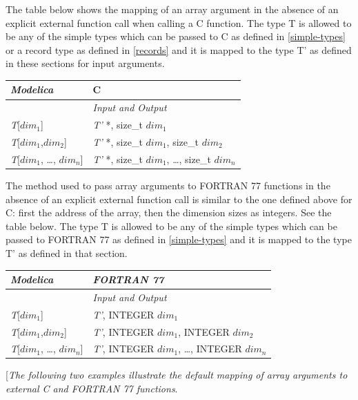 \documentclass[10pt,a4paper]{report}
\begin{document}
The table below shows the mapping of an array argument in the absence of
an explicit external function call when calling a C function. The type T
is allowed to be any of the simple types which can be passed to C as
defined in \ref{simple-types} or a record type as defined in 
\ref{records} and it is mapped to the type T' as defined in these sections
for input arguments.

\begin{longtable}[]{|l|l|}
\hline
\emph{Modelica} & C\\ \hline
& \emph{Input and Output}\\ \hline
\endhead
\emph{T}{[}$\textit{dim}_1${]} & \emph{T'} *, size\_t
$\textit{dim}_1$\\ \hline
\emph{T}{[}$\textit{dim}_1$,$\textit{dim}_2${]} &
\emph{T'} *, size\_t $\textit{dim}_1$, size\_t
$\textit{dim}_2$\\ \hline
\emph{T}{[}$\textit{dim}_1$, \ldots{},
$\textit{dim}_{n}${]} & \emph{T'} *, size\_t
$\textit{dim}_1$, \ldots{}, size\_t
$\textit{dim}_{n}$\\ \hline
\end{longtable}

The method used to pass array arguments to FORTRAN 77 functions in the
absence of an explicit external function call is similar to the one
defined above for C: first the address of the array, then the dimension
sizes as integers. See the table below. The type T is allowed to be any
of the simple types which can be passed to FORTRAN 77 as defined in
\ref{simple-types} and it is mapped to the type T' as defined in that
section.

\begin{longtable}[]{|l|l|}
\hline
\emph{Modelica} & \emph{FORTRAN 77}\\ \hline
& \emph{Input and Output}\\ \hline
\endhead
\emph{T}{[}$\textit{dim}_1${]} & \emph{T'}, INTEGER
$\textit{dim}_1$\\ \hline
\emph{T}{[}$\textit{dim}_1$,$\textit{dim}_2${]} &
\emph{T'}, INTEGER $\textit{dim}_1$, INTEGER
$\textit{dim}_2$\\ \hline
\emph{T}{[}$\textit{dim}_1$, \ldots{},
$\textit{dim}_{n}${]} & \emph{T'}, INTEGER
$\textit{dim}_1$, \ldots{}, INTEGER
$\textit{dim}_{n}$\\ \hline

\end{longtable}

{[}\emph{The following two examples illustrate the default mapping of
array arguments to external C and FORTRAN 77 functions}.
\end{document}
